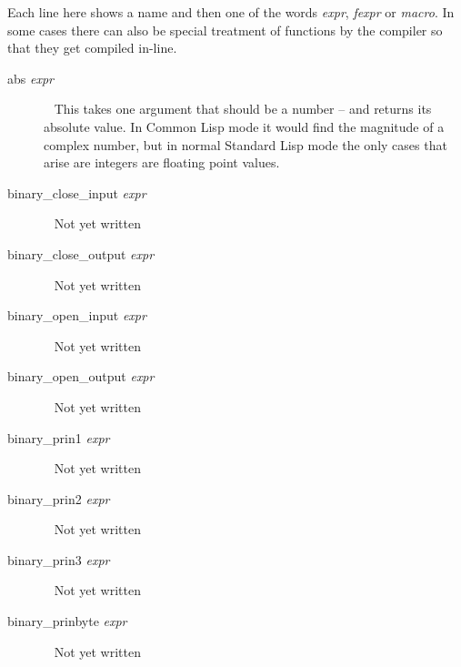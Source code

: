\documentclass[a4paper,11pt]{article}
\begin{document}
Each line here shows a name and then one of the words {\itshape  expr},
{\itshape  fexpr} or {\itshape  macro}. In some cases there can also be special
treatment of functions by the compiler so that they get compiled in-line.
\begin{description}

\item [{\ttfamily abs} {\itshape  expr}]  ~\newline
This takes one argument that should be a number -- and returns its absolute
value. In Common Lisp mode it would find the magnitude of a complex
number, but in normal Standard Lisp mode the only cases that arise are
integers are floating point values.

\item [{\ttfamily binary\_close\_input} {\itshape  expr}]  ~\newline
Not yet written

\item [{\ttfamily binary\_close\_output} {\itshape  expr}]  ~\newline
Not yet written

\item [{\ttfamily binary\_open\_input} {\itshape  expr}]  ~\newline
Not yet written

\item [{\ttfamily binary\_open\_output} {\itshape  expr}]  ~\newline
Not yet written

\item [{\ttfamily binary\_prin1} {\itshape  expr}]  ~\newline
Not yet written

\item [{\ttfamily binary\_prin2} {\itshape  expr}]  ~\newline
Not yet written

\item [{\ttfamily binary\_prin3} {\itshape  expr}]  ~\newline
Not yet written

\item [{\ttfamily binary\_prinbyte} {\itshape  expr}]  ~\newline
Not yet written


\end{description}
\end{document}
